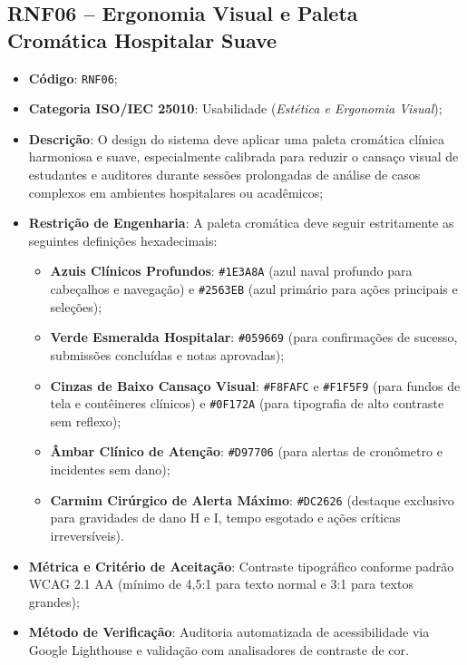 \subsection{RNF06 -- Ergonomia Visual e Paleta Cromática Hospitalar Suave}
\begin{itemize}
    \item \textbf{Código}: \texttt{RNF06};
    \item \textbf{Categoria ISO/IEC 25010}: Usabilidade (\textit{Estética e Ergonomia Visual});
    \item \textbf{Descrição}: O design do sistema deve aplicar uma paleta cromática clínica harmoniosa e suave, especialmente calibrada para reduzir o cansaço visual de estudantes e auditores durante sessões prolongadas de análise de casos complexos em ambientes hospitalares ou acadêmicos;
    \item \textbf{Restrição de Engenharia}: A paleta cromática deve seguir estritamente as seguintes definições hexadecimais:
    \begin{itemize}
        \item \textbf{Azuis Clínicos Profundos}: \texttt{\#1E3A8A} (azul naval profundo para cabeçalhos e navegação) e \texttt{\#2563EB} (azul primário para ações principais e seleções);
        \item \textbf{Verde Esmeralda Hospitalar}: \texttt{\#059669} (para confirmações de sucesso, submissões concluídas e notas aprovadas);
        \item \textbf{Cinzas de Baixo Cansaço Visual}: \texttt{\#F8FAFC} e \texttt{\#F1F5F9} (para fundos de tela e contêineres clínicos) e \texttt{\#0F172A} (para tipografia de alto contraste sem reflexo);
        \item \textbf{Âmbar Clínico de Atenção}: \texttt{\#D97706} (para alertas de cronômetro e incidentes sem dano);
        \item \textbf{Carmim Cirúrgico de Alerta Máximo}: \texttt{\#DC2626} (destaque exclusivo para gravidades de dano H e I, tempo esgotado e ações críticas irreversíveis).
    \end{itemize}
    \item \textbf{Métrica e Critério de Aceitação}: Contraste tipográfico conforme padrão WCAG 2.1 AA (mínimo de 4,5:1 para texto normal e 3:1 para textos grandes);
    \item \textbf{Método de Verificação}: Auditoria automatizada de acessibilidade via Google Lighthouse e validação com analisadores de contraste de cor.
\end{itemize}

